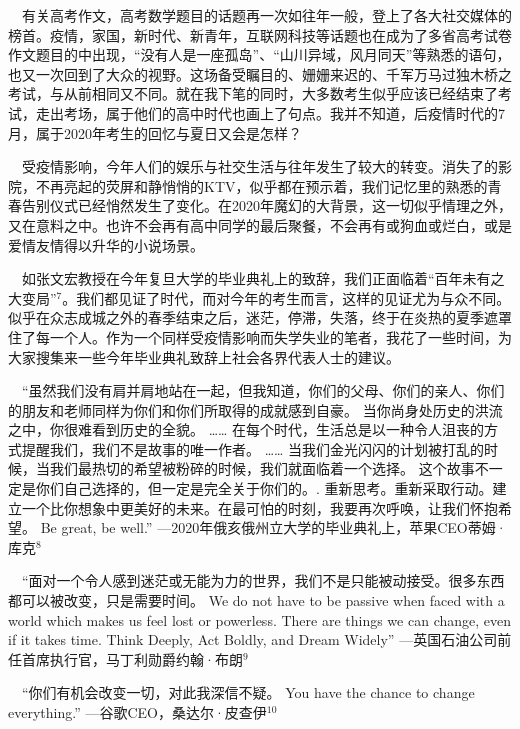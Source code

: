 \documentclass[]{article}
\begin{document}
\(\quad\)有关高考作文，高考数学题目的话题再一次如往年一般，登上了各大社交媒体的榜首。疫情，家国，新时代、新青年，互联网科技等话题也在成为了多省高考试卷作文题目的中出现，``没有人是一座孤岛''、``山川异域，风月同天''等熟悉的语句，也又一次回到了大众的视野。这场备受瞩目的、姗姗来迟的、千军万马过独木桥之考试，与从前相同又不同。就在我下笔的同时，大多数考生似乎应该已经结束了考试，走出考场，属于他们的高中时代也画上了句点。我并不知道，后疫情时代的7月，属于2020年考生的回忆与夏日又会是怎样？

\(\quad\)受疫情影响，今年人们的娱乐与社交生活与往年发生了较大的转变。消失了的影院，不再亮起的荧屏和静悄悄的KTV，似乎都在预示着，我们记忆里的熟悉的青春告别仪式已经悄然发生了变化。在2020年魔幻的大背景，这一切似乎情理之外，又在意料之中。也许不会再有高中同学的最后聚餐，不会再有或狗血或烂白，或是爱情友情得以升华的小说场景。

\(\quad\)如张文宏教授在今年复旦大学的毕业典礼上的致辞，我们正面临着``百年未有之大变局''\(^7\)。我们都见证了时代，而对今年的考生而言，这样的见证尤为与众不同。似乎在众志成城之外的春季结束之后，迷茫，停滞，失落，终于在炎热的夏季遮罩住了每一个人。作为一个同样受疫情影响而失学失业的笔者，我花了一些时间，为大家搜集来一些今年毕业典礼致辞上社会各界代表人士的建议。

\(\quad\)``虽然我们没有肩并肩地站在一起，但我知道，你们的父母、你们的亲人、你们的朋友和老师同样为你们和你们所取得的成就感到自豪。
当你尚身处历史的洪流之中，你很难看到历史的全貌。 \ldots{}\ldots{}
在每个时代，生活总是以一种令人沮丧的方式提醒我们，我们不是故事的唯一作者。
\ldots{}\ldots{}
当我们金光闪闪的计划被打乱的时候，当我们最热切的希望被粉碎的时候，我们就面临着一个选择。
这个故事不一定是你们自己选择的，但一定是完全关于你们的。.
重新思考。重新采取行动。建立一个比你想象中更美好的未来。在最可怕的时刻，我要再次呼唤，让我们怀抱希望。
Be great, be well.''
---2020年俄亥俄州立大学的毕业典礼上，苹果CEO蒂姆·库克\(^8\)

\(\quad\)``面对一个令人感到迷茫或无能为力的世界，我们不是只能被动接受。很多东西都可以被改变，只是需要时间。
We do not have to be passive when faced with a world which makes us feel
lost or powerless. There are things we can change, even if it takes
time. Think Deeply, Act Boldly, and Dream Widely''
---英国石油公司前任首席执行官，马丁利勋爵约翰·布朗\(^9\)

\(\quad\)``你们有机会改变一切，对此我深信不疑。 You have the chance to
change everything.'' ---谷歌CEO，桑达尔·皮查伊\(^10\)

\vspace{5mm}
\end{document}
